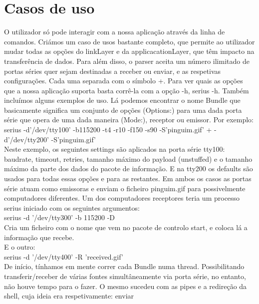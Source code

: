 \documentclass[a4paper]{article}
\begin{document}
\section{Casos de uso}
O utilizador só pode interagir com a nossa aplicação através da linha de
comandos. Criámos um caso de usos bastante completo, que permite ao utilizador
mudar todas as opções do linkLayer e da applicacationLayer, que têm impacto na
transferência de dados. Para além disso, o parser aceita um número ilimitado de
portas séries quer sejam destinadas a receber ou enviar, e as respetivas
configurações. Cada uma separada com o símbolo +. Para ver quais as opções que
a nossa aplicação suporta basta corrê-la com a opção -h, serius -h. Também
incluímos alguns exemplos de uso. Lá podemos encontrar o nome Bundle que
basicamente significa um conjunto de opções (Options:) para uma dada porta
série que opera de uma dada maneira (Mode:), receptor ou emissor. Por
exemplo:\\\newline serius -d'/dev/tty100' -b115200 -t4 -r10 -f150 -s90
-S'pinguim.gif' + -d'/dev/tty200' -S'pinguim.gif'\\\newline Neste exemplo, os
seguintes settings são aplicados na porta série tty100: baudrate, timeout,
retries, tamanho máximo do payload (unstuffed) e o tamanho máximo da parte dos
dados do pacote de informação. E na tty200 os defaults são usados para todas
essas opções e para as restantes. Em ambos os casos as portas série atuam como
emissoras e enviam o ficheiro pinguim.gif para possivelmente computadores
diferentes. Um dos computadores receptores teria um processo serius iniciado
com os seguintes argumentos:\\\newline serius -d '/dev/tty300' -b 115200 -D\\
Cria um ficheiro com o nome que vem no pacote de controlo start, e coloca lá a
informação que recebe. \\\newline E o outro:\\\newline serius -d '/dev/tty400'
-R 'received.gif' \\\newline De início, tínhamos em mente correr cada Bundle
numa thread. Possibilitando transferir/receber de várias fontes simultâneamente
via porta série, no entanto, não houve tempo para o fazer. O mesmo sucedeu com
as pipes e a redireção da shell, cuja ideia era respetivamente: enviar
\end{document}
